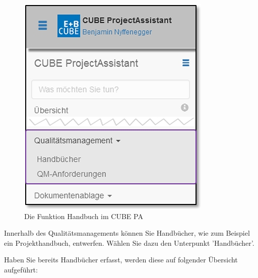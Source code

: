 \begin{figure}   %
  \vspace{-35pt}      %
  \begin{center}
    \includegraphics[width=1\linewidth]{../chapters/09_Qualitaetsmanagement/pictures/9-2_Menu_Qualitaetsmanagement_Handbuch.jpg}
  \end{center}
  \vspace{-20pt}
  \caption{Die Funktion Handbuch im CUBE PA}
  \vspace{-10pt}
\end{figure}

Innerhalb des Qualitätsmanagements können Sie Handbücher, wie zum Beispiel ein Projekthandbuch, entwerfen. Wählen Sie dazu den Unterpunkt 'Handbücher'. 

\vspace{2.5cm}  

Haben Sie bereits Handbücher erfasst, werden diese auf folgender Übersicht aufgeführt:

\vspace{3cm}  

